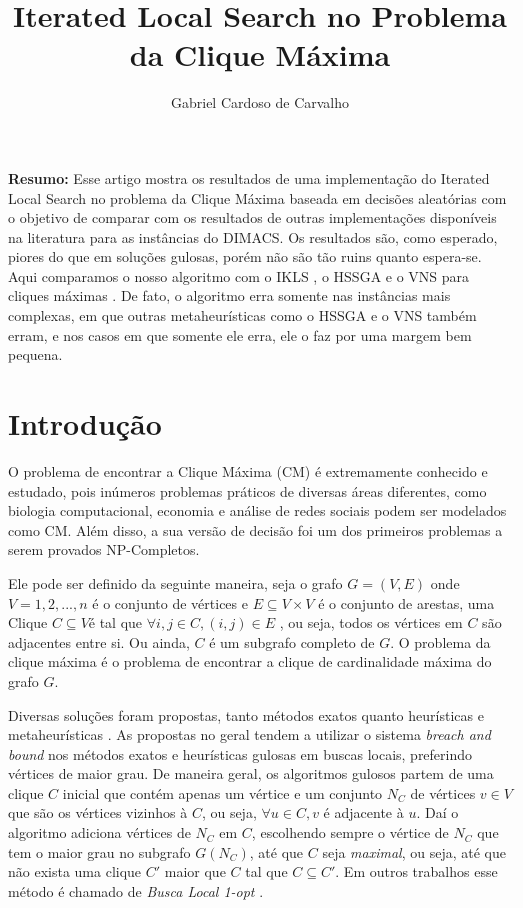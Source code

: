 \documentclass{article}
\title{Iterated Local Search no Problema da Clique Máxima}
\author{Gabriel Cardoso de Carvalho}
\date{}
\begin{document}
\maketitle

\textbf{Resumo:} Esse artigo mostra os resultados de uma implementação do Iterated Local Search no problema da Clique Máxima baseada em decisões aleatórias com o objetivo de comparar com os resultados de outras implementações disponíveis na literatura para as instâncias do DIMACS. Os resultados são, como esperado, piores do que em soluções gulosas, porém não são tão ruins quanto espera-se. Aqui comparamos o nosso algoritmo com o IKLS \cite{kopt}, o HSSGA \cite{HSSGA} e o VNS para cliques máximas \cite{vns}. De fato, o algoritmo erra somente nas instâncias mais complexas, em que outras metaheurísticas como o HSSGA e o VNS também erram, e nos casos em que somente ele erra, ele o faz por uma margem bem pequena.

\section{Introdução}

O problema de encontrar a Clique Máxima (CM) é extremamente conhecido e estudado, pois inúmeros problemas práticos de diversas áreas diferentes, como biologia computacional, economia e análise de redes sociais podem ser modelados como CM. 
Além disso, a sua versão de decisão foi um dos primeiros problemas a serem provados NP-Completos.\par 

Ele pode ser definido da seguinte maneira, seja o grafo $G=(V,E)$ onde $V = 1,2, ... , n$ é o conjunto de vértices e $E \subseteq V \times V$ é o conjunto de arestas, uma Clique $C \subseteq V $é tal que $\forall i,j \in C, (i,j) \in E$ 
, ou seja, todos os vértices em $C$ são adjacentes entre si. Ou ainda, $C$ é um subgrafo completo de $G$. O problema da clique máxima é o problema de encontrar a clique de cardinalidade máxima do grafo $G$.\par

Diversas soluções foram propostas, tanto métodos exatos quanto heurísticas e metaheurísticas \cite{review,pardaloshand,DIMACS2}. As propostas no geral tendem a utilizar o sistema \textit{breach and bound} nos métodos exatos e heurísticas gulosas em buscas locais, preferindo vértices de maior grau. De maneira geral, os algoritmos gulosos partem de uma clique $C$ inicial que contém apenas um vértice e um conjunto $N_C$ de vértices $v \in V$ que são os vértices vizinhos à $C$, ou seja, $\forall u \in C, v$ é adjacente à $u$. Daí o algoritmo adiciona vértices de  $N_C$ em $C$, escolhendo sempre o vértice de $N_C$ que tem o maior grau no subgrafo $G(N_C)$, até que $C$ seja \textit{maximal}, ou seja, até que não exista uma clique $C'$ maior que $C$ tal que $C \subseteq C'$. Em outros trabalhos esse método é chamado de \textit{Busca Local 1-opt } \cite{KLS}.\par
\end{document}
